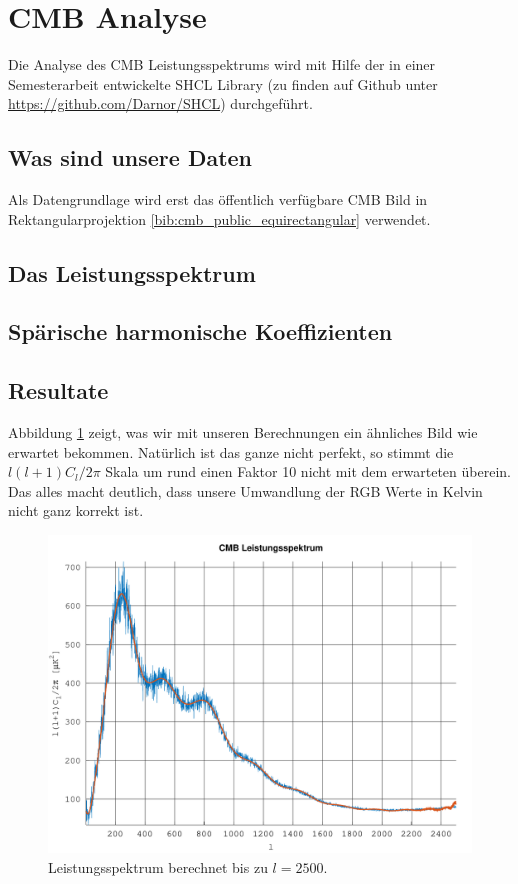 \section{CMB Analyse}

Die Analyse des CMB Leistungsspektrums wird mit Hilfe der in einer 
Semesterarbeit entwickelte SHCL Library (zu finden auf Github unter 
\url{https://github.com/Darnor/SHCL}) durchgeführt.

\subsection{Was sind unsere Daten}
Als Datengrundlage wird erst das öffentlich verfügbare CMB Bild in 
Rektangularprojektion \ref{bib:cmb_public_equirectangular} verwendet.

\subsection{Das Leistungsspektrum}


\subsection{Spärische harmonische Koeffizienten}

\subsection{Resultate}

Abbildung \ref{fig:cmb-power-spec-2500} zeigt, was wir mit unseren Berechnungen 
ein ähnliches Bild wie erwartet bekommen. Natürlich ist das ganze nicht 
perfekt, so stimmt die $l(l+1)C_l/2\pi$ Skala um rund einen Faktor 10 nicht mit 
dem erwarteten überein. Das alles macht deutlich, dass unsere Umwandlung der 
RGB Werte in Kelvin nicht ganz korrekt ist.

\begin{figure}
	\centering
	\includegraphics[width=\linewidth]{cmb/images/12k_2500.pdf}
	\caption{Leistungsspektrum berechnet bis zu $l = 2500$.}
	\label{fig:cmb-power-spec-2500}
\end{figure}


